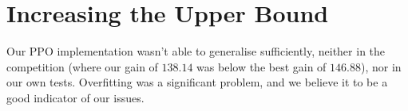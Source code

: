 \documentclass[conference]{IEEEtran}
\begin{document}



    \section{Increasing the Upper Bound}\label{subsec:increasing-the-upper-bound}
    Our PPO implementation wasn't able to generalise sufficiently, neither in the competition (where our gain of $138.14$ was below the best gain of $146.88$)\cite{evoman_competition_results}, nor in our own tests. Overfitting was a significant problem, and we believe it to be a good indicator of our issues.
    
\end{document}
